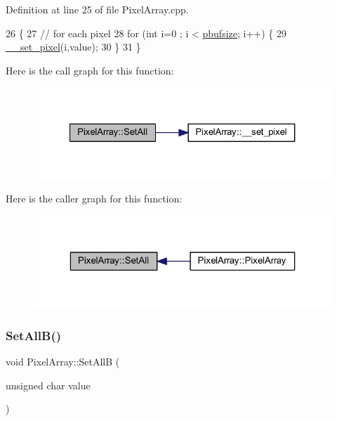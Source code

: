 Definition at line 25 of file Pixel\+Array.\+cpp.


\begin{DoxyCode}
26 \{
27     \textcolor{comment}{// for each pixel}
28     \textcolor{keywordflow}{for} (\textcolor{keywordtype}{int} i=0 ; i < \hyperlink{class_pixel_array_aca29e70f9b643bff3733ab2e694439a1}{pbufsize}; i++) \{
29         \hyperlink{class_pixel_array_a4b1a6582bc3bab1f67aebd1f97a5595d}{\_\_set\_pixel}(i,value);
30     \}
31 \}
\end{DoxyCode}
Here is the call graph for this function\+:\nopagebreak
\begin{figure}[H]
\begin{center}
\leavevmode
\includegraphics[width=327pt]{class_pixel_array_a5f560dcef3d1582614858969b20da89d_cgraph}
\end{center}
\end{figure}
Here is the caller graph for this function\+:\nopagebreak
\begin{figure}[H]
\begin{center}
\leavevmode
\includegraphics[width=323pt]{class_pixel_array_a5f560dcef3d1582614858969b20da89d_icgraph}
\end{center}
\end{figure}
\mbox{\label{class_pixel_array_a3b17271fdc21503236ca6ca8e37d501b}} 
\subsubsection{\texorpdfstring{Set\+All\+B()}{SetAllB()}}
{\footnotesize\ttfamily void Pixel\+Array\+::\+Set\+AllB (\begin{DoxyParamCaption}\item[{unsigned char}]{value }\end{DoxyParamCaption})}



